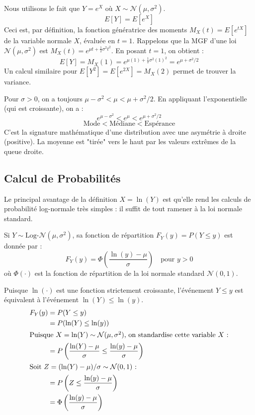\begin{proofbox}
Nous utilisons le fait que $Y = e^X$ où $X \sim \mathcal{N}(\mu, \sigma^2)$.
$$ E[Y] = E[e^X] $$
Ceci est, par définition, la fonction génératrice des moments $M_X(t) = E[e^{tX}]$ de la variable normale $X$, évaluée en $t=1$.
Rappelons que la MGF d'une loi $\mathcal{N}(\mu, \sigma^2)$ est $M_X(t) = e^{\mu t + \frac{1}{2}\sigma^2 t^2}$.
En posant $t=1$, on obtient :
$$ E[Y] = M_X(1) = e^{\mu(1) + \frac{1}{2}\sigma^2 (1)^2} = e^{\mu + \sigma^2/2} $$
Un calcul similaire pour $E[Y^2] = E[e^{2X}] = M_X(2)$ permet de trouver la variance.
\end{proofbox}

\begin{remarquebox}
Pour $\sigma > 0$, on a toujours $\mu - \sigma^2 < \mu < \mu + \sigma^2/2$.
En appliquant l'exponentielle (qui est croissante), on a :
$$ e^{\mu - \sigma^2} < e^{\mu} < e^{\mu + \sigma^2/2} $$
$$ \text{Mode} < \text{Médiane} < \text{Espérance} $$
C'est la signature mathématique d'une distribution avec une asymétrie à droite (positive). La moyenne est "tirée" vers le haut par les valeurs extrêmes de la queue droite.
\end{remarquebox}

\subsection{Calcul de Probabilités}

Le principal avantage de la définition $X = \ln(Y)$ est qu'elle rend les calculs de probabilité log-normale très simples : il suffit de tout ramener à la loi normale standard.

\begin{theorembox}
Si $Y \sim \text{Log-}\mathcal{N}(\mu, \sigma^2)$, sa fonction de répartition $F_Y(y) = P(Y \le y)$ est donnée par :
$$ F_Y(y) = \Phi\left( \frac{\ln(y) - \mu}{\sigma} \right) \quad \text{pour } y > 0 $$
où $\Phi(\cdot)$ est la fonction de répartition de la loi normale standard $\mathcal{N}(0, 1)$.
\end{theorembox}

\begin{proofbox}
Puisque $\ln(\cdot)$ est une fonction strictement croissante, l'événement $Y \le y$ est équivalent à l'événement $\ln(Y) \le \ln(y)$.
\begin{align*}
F_Y(y) &= P(Y \le y) \\
&= P(\ln(Y) \le \ln(y)) \\
\intertext{Puisque $X = \ln(Y) \sim \mathcal{N}(\mu, \sigma^2)$, on standardise cette variable $X$ :}
&= P\left( \frac{\ln(Y) - \mu}{\sigma} \le \frac{\ln(y) - \mu}{\sigma} \right) \\
\intertext{Soit $Z = (\ln(Y) - \mu)/\sigma \sim \mathcal{N}(0, 1)$ :}
&= P\left( Z \le \frac{\ln(y) - \mu}{\sigma} \right) \\
&= \Phi\left( \frac{\ln(y) - \mu}{\sigma} \right)
\end{align*}
\end{proofbox}

